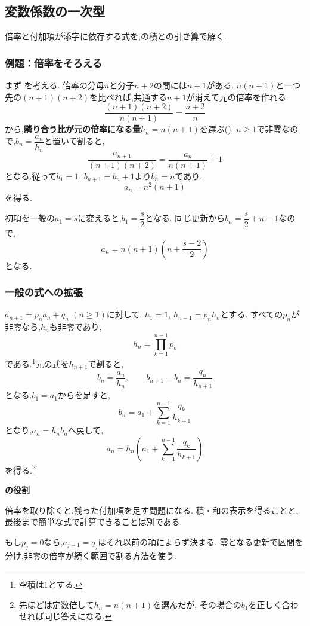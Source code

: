 \subsection{変数係数の一次型}\label{節：変数係数の一次型}
倍率と付加項が添字に依存する式を,の積との引き算で解く.

\subsubsection{例題：倍率をそろえる}
まず
\BookMathLayout{\[
    a_1=2,\qquad
    a_{n+1}=\frac{n+2}{n}a_n+(n+1)(n+2)
    \quad(n\ge1)
  \]}{\[
    \begin{aligned}
      a_1&=2,\\
      a_{n+1}&=\frac{n+2}{n}a_n+(n+1)(n+2)\\
      &\quad(n\ge1)
    \end{aligned}
  \]}
を考える.
倍率の分母$n$と分子$n+2$の間には$n+1$がある.
$n(n+1)$と一つ先の$(n+1)(n+2)$を比べれば,共通する$n+1$が消えて元の倍率を作れる.
\[
  \frac{(n+1)(n+2)}{n(n+1)}=\frac{n+2}{n}
\]
から,\textbf{隣り合う比が元の倍率になる量}$h_n=n(n+1)$を選ぶ().
$n\ge1$で非零なので,$b_n=\dfrac{a_n}{h_n}$と置いて割ると,
\[
  \frac{a_{n+1}}{(n+1)(n+2)}
  =\frac{a_n}{n(n+1)}+1
\]
となる.従って$b_1=1$, $b_{n+1}=b_n+1$より$b_n=n$であり,
\[
  a_n=n^2(n+1)
\]
を得る.

初項を一般の$a_1=s$に変えると,$b_1=\dfrac{s}{2}$となる.
同じ更新から$b_n=\dfrac{s}{2}+n-1$なので,
\[
  a_n=n(n+1)\left(n+\frac{s-2}{2}\right)
\]
となる.

\subsubsection{一般の式への拡張}
$a_{n+1}=p_na_n+q_n$ $(n\ge1)$に対して,
$h_1=1$, $h_{n+1}=p_nh_n$とする.
すべての$p_n$が非零なら,$h_n$も非零であり,
\[
  h_n=\prod_{k=1}^{n-1}p_k
\]
である.\footnote{空積は$1$とする.}元の式を$h_{n+1}$で割ると,
\[
  b_n=\frac{a_n}{h_n},\qquad
  b_{n+1}-b_n=\frac{q_n}{h_{n+1}}
\]
となる.$b_1=a_1$からを足すと,
\[
  b_n=a_1+\sum_{k=1}^{n-1}\frac{q_k}{h_{k+1}}
\]
となり,$a_n=h_nb_n$へ戻して,
\[
  a_n=h_n\left(a_1+\sum_{k=1}^{n-1}\frac{q_k}{h_{k+1}}\right)
\]
を得る.\footnote{先ほどは定数倍して$h_n=n(n+1)$を選んだが,
  その場合の$b_1$を正しく合わせれば同じ答えになる.}
\begin{bookpoint}
  \textbf{の役割}\par
  倍率を取り除くと,残った付加項を足す問題になる.
  積・和の表示を得ることと,最後まで簡単な式で計算できることは別である.
\end{bookpoint}
もし$p_j=0$なら,$a_{j+1}=q_j$はそれ以前の項によらず決まる.
零となる更新で区間を分け,非零の倍率が続く範囲で割る方法を使う.


